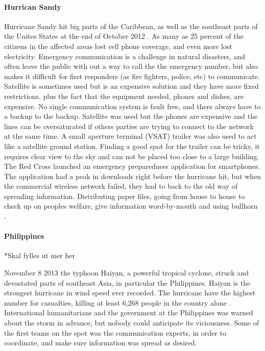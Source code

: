 \paragraph{Hurrican Sandy}
Hurricane Sandy hit big parts of the Caribbean, as well as the southeast parts of the Unites States at the end of October 2012 \cite{WikiSandy}. As many as 25 percent of the citizens in the affected areas lost cell phone coverage, and even more lost electricity. Emergency communication is a challenge in natural disasters, and often leave the public with out a way to call the the emergency number, but also makes it difficult for first responders (as fire fighters, police, etc) to communicate.  Satellite is sometimes used but is an expensive solution and they have more fixed restrictions, plus the fact that the equipment needed, phones and dishes, are expensive. No single communication system is fault free, and there always have to a backup to the backup. Satellite was used but the phones are expensive and the lines can be oversaturated if others parties are trying to connect to the network at the same time. A small aperture terminal (VSAT) trailer was also used to act like a satellite ground station. Finding a good spot for the trailer can be tricky, it requires clear view to the sky and can not be placed too close to a large building. The Red Cross launched an emergency preparedness application for smartphones. The application had a peak in downloads right before the hurricane hit, but when the commercial wireless network failed, they had to back to the old way of spreading information. Distributing paper files, going from house to house to check up on peoples welfare, give information word-by-mouth and using bullhorn \cite{hurricaneSandy}.

\paragraph{Philippines}

*Skal fylles ut mer her

November 8 2013 the typhoon Haiyan, a powerful tropical cyclone, struck and devastated parts of southeast Asia, in particular the Philippines. Haiyan is the strongest hurricane in wind speed ever recorded. The hurricane have the highest number for casualties, killing at least 6,268 people in the country alone \cite{wikiHaiyan}. International humanitarians and the government at the Philippines was warned about the storm in advance, but nobody could anticipate its viciousness. Some of the first teams on the spot was the communication experts, in order to coordinate, and make sure information was spread as desired.    \cite{disasterResponse} 

